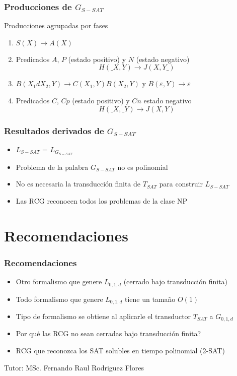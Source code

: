 \documentclass{beamer}
\newcommand{\tutor}{MSc. Fernando Raul Rodriguez Flores} %
\begin{document}
\begin{frame}
    \frametitle{Producciones de $G_{S-SAT}$}
    
    Producciones agrupadas por fases
    \begin{enumerate}
        \item $S(X)\to A(X)$
              \pause
        \item Predicados $A$, $P$ (estado positivo) y $N$ (estado negativo)
              $$H(\_X,Y)\to J(X,Y\_)$$
              \pause
        \item $B(X_1dX_2,Y)\to C(X_1,Y) B(X_2,Y)$ y $B(\varepsilon,Y)\to\varepsilon$
              \pause
        \item Predicados $C$, $Cp$ (estado positivo) y $Cn$ estado negativo\\
              $$H(\_X,\_Y)\to J(X,Y)$$
              
    \end{enumerate}
    
\end{frame}

\begin{frame}
    \frametitle{Resultados derivados de $G_{S-SAT}$}
    
    
    \begin{itemize}
        \item $L_{S-SAT}$ = $L_{G_{S-SAT}}$
              \pause
        \item Problema de la palabra $G_{S-SAT}$ no es polinomial
              \pause
        \item No es necesaria la transducción finita de $T_{SAT}$ para construir $L_{S-SAT}$
              \pause
        \item Las RCG reconocen todos los problemas de la clase NP
    \end{itemize}
\end{frame}

\section{Recomendaciones}
\begin{frame}
    \frametitle{Recomendaciones}
    
    \begin{itemize}
        \item Otro formalismo que genere $L_{0,1,d}$ (cerrado bajo transducción finita)
              \pause
        \item Todo formalismo que genere $L_{0,1,d}$ tiene un tamaño $O(1)$
              \pause
        \item Tipo de formalismo se obtiene al aplicarle el transductor $T_{SAT}$ a $G_{0,1,d}$
              \pause
        \item Por qué las RCG no sean cerradas bajo transducción finita?
              \pause
        \item RCG que reconozca los SAT solubles en tiempo polinomial (2-SAT)
    \end{itemize}
    
    
\end{frame}

\begin{frame}
    \titlepage
    \vspace{1cm} %
    \begin{center}
        Tutor: \tutor
    \end{center}
\end{frame}
\end{document}
